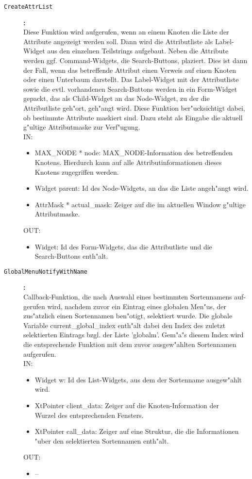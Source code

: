 \begin{description}
\item[\tt CreateAttrList]{\bf :\\}
Diese Funktion wird aufgerufen, wenn an einem Knoten die Liste der Attribute angezeigt werden soll. Dann wird die Attributliste als Label-Widget aus den einzelnen Teilstrings aufgebaut. Neben die Attribute werden ggf. Command-Widgets, die Search-Buttons, plaziert. Dies ist dann der Fall, wenn das betreffende Attribut einen Verweis auf einen Knoten oder einen Unterbaum darstellt. Das Label-Widget mit der Attributliste sowie die evtl. vorhandenen Search-Buttons werden in ein Form-Widget gepackt, das als Child-Widget an das Node-Widget, zu der die Attributliste geh"ort, geh"angt wird. Diese Funktion ber"ucksichtigt dabei, ob bestimmte Attribute maskiert sind. Dazu steht als Eingabe die aktuell g"ultige Attributmaske zur Verf"ugung. \\
IN:
\begin{itemize}
   \item MAX\_NODE * node: MAX\_NODE-Information des betreffenden Knotens. Hierdurch kann auf alle Attributinformationen dieses Knotens zugegriffen werden. \item Widget parent:   Id des Node-Widgets, an das die Liste angeh"angt wird. \item AttrMask * actual\_mask: Zeiger auf die im aktuellen Window g"ultige Attributmaske.
\end{itemize}
OUT:
\begin{itemize}
   \item Widget: Id des Form-Widgets, das die Attributliste und die\\ 
         Search-Buttons enth"alt.
\end{itemize}

\item[\tt GlobalMenuNotifyWithName]{\bf :\\}
Callback-Funktion, die nach Auswahl eines bestimmten Sortennamens auf- gerufen wird, nachdem zuvor ein Eintrag eines globalen Men"us, der zus"atzlich einen Sortennamen ben"otigt, selektiert wurde. Die globale Variable current\_global\_index enth"alt dabei den Index des zuletzt selektierten Eintrags bzgl. der Liste 'globalm'. Gem"a"s diesem Index wird die entsprechende Funktion mit dem zuvor ausgew"ahlten Sortennamen aufgerufen. \\
IN:
\begin{itemize}
   \item Widget w:      Id des List-Widgets, aus dem der Sortenname ausgew"ahlt wird. \item XtPointer client\_data: Zeiger auf die Knoten-Information der \\
Wurzel des entsprechenden Fensters. \item XtPointer call\_data:   Zeiger auf eine Struktur, die die Informationen "uber den selektierten Sortennamen enth"alt.
\end{itemize}
OUT:
\begin{itemize}
   \item --
\end{itemize}


\end{description}
